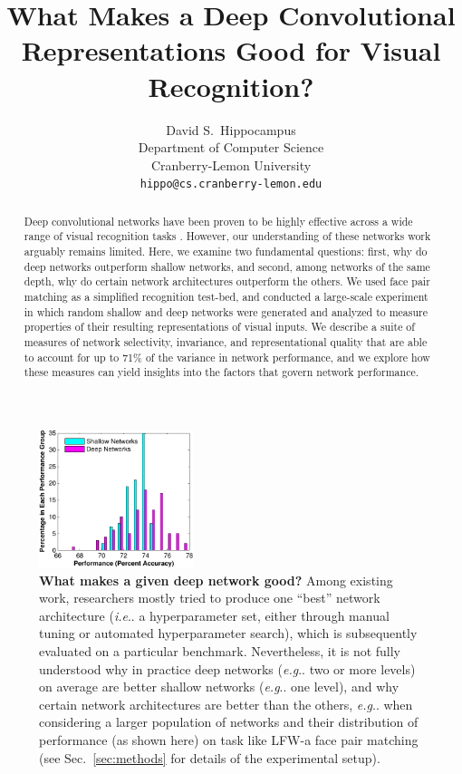 \documentclass[fleqn]{article} %
\title{What Makes a Deep Convolutional Representations Good for Visual Recognition?} %
\author{
David S.~Hippocampus\\
Department of Computer Science\\
Cranberry-Lemon University\\
\texttt{hippo@cs.cranberry-lemon.edu} \\
}
\makeatletter
\DeclareRobustCommand\onedot{\futurelet\@let@token\@onedot}
\def\@onedot{\ifx\@let@token.\else.\null\fi\xspace}
\def\eg{\emph{e.g}\onedot} \def\Eg{\emph{E.g}\onedot}
\def\ie{\emph{i.e}\onedot} \def\Ie{\emph{I.e}\onedot}
\makeatother
\begin{document}
\maketitle

\begin{abstract}
Deep convolutional networks have been proven to be highly effective across a wide range of visual recognition tasks \cite{szegedy2014going, schroff2015facenet, donahue2014decaf}.
However, our understanding of these networks work arguably remains limited.
Here, we examine two fundamental questions: first, why do deep networks outperform shallow networks, and second, among networks of the same depth, why do certain network architectures outperform the others.
We used face pair matching as a simplified recognition test-bed, and conducted a large-scale experiment in which random shallow and deep networks were generated and analyzed to measure properties of their resulting representations of visual inputs.
We describe a suite of measures of network selectivity, invariance, and representational quality that are able to account for up to 71\% of the variance in network performance, and we explore how these measures can yield insights into the factors that govern network performance.  
\end{abstract}

\begin{figure} %
\centering \includegraphics[width=0.40\textwidth]{Figs/perf.pdf} %
\caption{{\bf What makes a given deep network good?}
Among existing work, researchers mostly tried to produce one ``best'' network architecture (\ie a hyperparameter set, either through manual tuning or automated hyperparameter search), which is subsequently evaluated on a particular benchmark.
Nevertheless, it is not fully understood why in practice deep networks (\eg two or more levels) on average are better shallow networks (\eg one level), and why certain network architectures are better than the others, \eg when considering a larger population of networks \cite{cox2011beyond} and their distribution of performance (as shown here) on task like LFW-a face pair matching \cite{wolf2011effective} (see Sec.~\ref{sec:methods} for details of the experimental setup). \vspace{-0.5ex}}
\label{fig:perf}
\end{figure}
\end{document}
